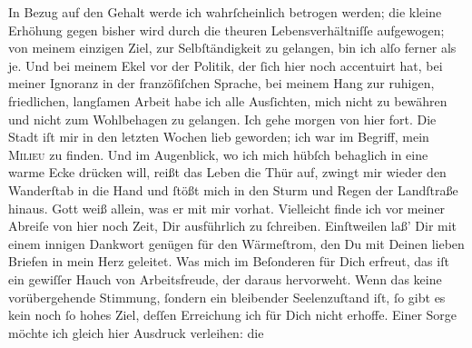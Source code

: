 \begin{ledgroupsized}[t]{13cm}
               In Bezug auf den Gehalt werde ich wahrſcheinlich betrogen werden; die kleine Erhöhung
               gegen bisher wird durch die theuren Lebensverhältniſſe aufgewogen; von meinem
               einzigen Ziel, zur Selbſtändigkeit zu  gelangen, bin ich alſo ferner als je. Und bei meinem Ekel vor der Politik, der
               ſich hier noch  accentuirt hat, bei meiner Ignoranz
               in der franzöſiſchen Sprache, bei meinem Hang zur ruhigen, \strikeout{\textcolor{gray}{ſt}} friedlichen, langſamen Arbeit habe ich alle Ausſichten, mich nicht zu bewähren
               und nicht zum Wohlbehagen zu gelangen. Ich gehe morgen
               von hier fort. Die Stadt iſt
               mir in den letzten Wochen lieb geworden; ich war im Begriff, mein \textsc{Milieu} zu finden. Und im Augenblick, wo ich mich hübſch
               behaglich in eine warme Ecke drücken will, {\pb} reißt das Leben die Thür auf, zwingt mir wieder
               den Wanderſtab  in die Hand und ſtößt mich in
               den Sturm und Regen der Landſtraße hinaus. Gott weiß allein, was er mit mir
               vorhat.\pend
           \pstart
           Vielleicht finde ich vor meiner Abreiſe von hier noch Zeit, Dir ausführlich zu
               ſchreiben. Einſtweilen laß’ Dir mit einem innigen Dankwort genügen für den
               Wärmeſtrom, den Du mit Deinen lieben Briefen in mein Herz geleitet. Was mich im
               Beſonderen für Dich erfreut, das iſt ein gewiſſer Hauch von Arbeitsfreude, der daraus
               hervorweht. Wenn das keine vorübergehende Stimmung, ſondern ein bleibender
               Seelenzuſtand iſt, ſo gibt es kein noch ſo hohes Ziel, deſſen Erreichung ich für Dich
               nicht erhoffe. Einer Sorge möchte ich gleich hier Ausdruck verleihen:  die \label{K_L02670-1v}
\end{ledgroupsized}
